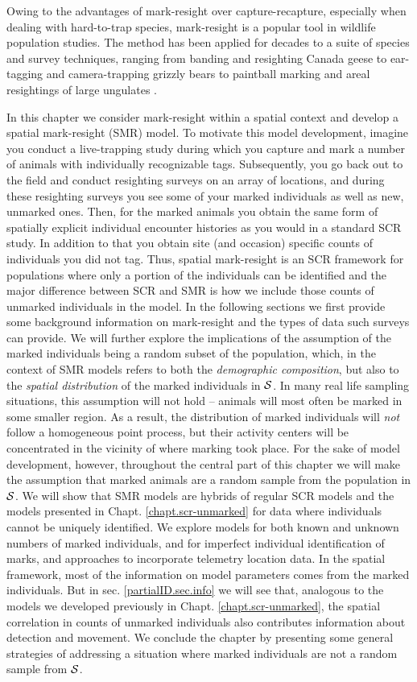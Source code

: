 Owing to the advantages of mark-resight over capture-recapture,
especially when dealing with hard-to-trap species, mark-resight is a
popular tool in wildlife population studies. The method has been
applied for decades
to a suite of species and survey techniques,
ranging from banding and resighting Canada geese
\citep{hestbeck_malecki:1989} to ear-tagging and camera-trapping
grizzly bears \citep{mace_etal:1994} to paintball marking and areal
resightings of large ungulates \citep{skalski_etal:2005jwm}.

In this chapter we consider mark-resight within
a spatial context and
develop a spatial mark-resight (SMR) model. To motivate this model
development, imagine you conduct a live-trapping study during which
you capture and mark a number of animals with individually
recognizable tags. Subsequently, you go back out to the field and
conduct resighting surveys on an array of locations, and during these
resighting surveys you see some of your marked individuals as well as
new, unmarked ones. Then, for the marked animals you obtain the same
form of spatially explicit individual encounter histories as you would
in a standard SCR study. In addition to that you obtain site (and occasion)
specific counts of individuals you did not tag. Thus, spatial
mark-resight is an SCR framework for populations where only a portion of
the individuals can be identified and the major difference between SCR
and SMR is how we include those counts of unmarked individuals in the
model. In the following sections we first provide some background
information on mark-resight and the types of data such surveys can
provide. We will further explore the implications of the assumption of
the marked individuals being a random subset of the population, which,
in the context of SMR models refers to both the \emph{demographic
  composition}, but also to the \emph{spatial distribution} of the
marked individuals in ${\cal S}$. 
In many real life sampling situations, this assumption will not hold -- animals will most often be marked in some smaller region. As a result, the distribution of marked individuals will \emph{not} follow a homogeneous point process, but their activity centers will be concentrated in the vicinity of where marking took place. 
For the sake of model development, however, throughout the central part of this chapter we will make the assumption that marked animals are a random sample from the population in ${\cal S}$. We will show that SMR models are hybrids of regular SCR models and the models
presented in Chapt. \ref{chapt.scr-unmarked} for data where
individuals cannot be uniquely identified. We explore models for both
known and unknown numbers of marked individuals, and for imperfect
individual identification of marks, and approaches to incorporate
telemetry location data. In the spatial framework, most of the
information on model parameters comes from the marked individuals. But
in sec. \ref{partialID.sec.info} we will see that, analogous to the
models we developed previously in Chapt. \ref{chapt.scr-unmarked}, the
spatial correlation in counts of unmarked individuals also contributes
information about detection and movement. 
We conclude the chapter by presenting some general strategies of addressing a situation where marked individuals are not a random sample from ${\cal S}$. 


